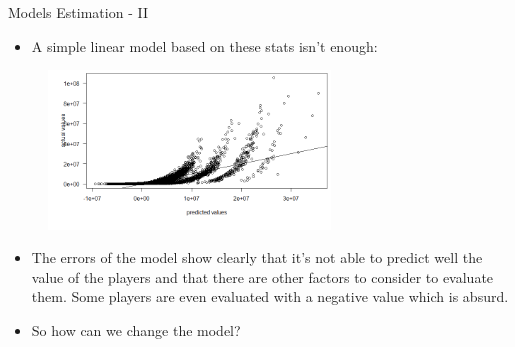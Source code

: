 \documentclass[aspectratio=169,xcolor=dvipsnames]{beamer}
\begin{document}
\begin{frame}{Models Estimation - II}
\begin{itemize}
\item A simple linear model based on these stats isn't enough:
\end{itemize}

\begin{figure}[H] 
\begin{center}
  \includegraphics[width=7.5cm]{residui1.png}
 \end{center}
\end{figure}
\begin{itemize}
\item The errors of the model show clearly that it's not able to predict well the value of the players and that there are other factors to consider to evaluate them. Some players are even evaluated with a negative value which is absurd.

\item So how can we change the model?
\end{itemize}
\end{frame}

\end{document}
